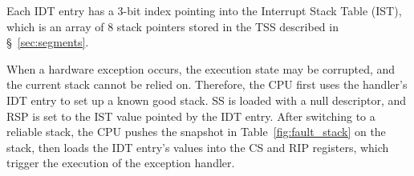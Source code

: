 \begin{table}[hbt]
  \caption{
    The essential fields of an IDT entry in 64-bit mode. Each entry points to a
    hardware exception or interrupt handler.
  }
  \label{fig:idt_entry}
\end{table}

Each IDT entry has a 3-bit index pointing into the Interrupt Stack Table (IST),
which is an array of 8 stack pointers stored in the TSS described in
\S~\ref{sec:segments}.


When a hardware exception occurs, the execution state may be corrupted, and the
current stack cannot be relied on. Therefore, the CPU first uses the handler's
IDT entry to set up a known good stack. SS is loaded with a null descriptor,
and RSP is set to the IST value pointed by the IDT entry. After switching to a
reliable stack, the CPU pushes the snapshot in Table~\ref{fig:fault_stack} on
the stack, then loads the IDT entry's values into the CS and RIP registers,
which trigger the execution of the exception handler.

\begin{table}[hbt]
  \caption{
    The snapshot pushed on the handler's stack when a hardware exception
    occurs. IRET restores registers from this snapshot.
  }
  \label{fig:fault_stack}
\end{table}

